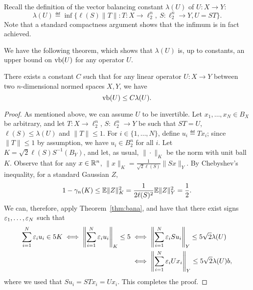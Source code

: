 Recall the definition of the vector balancing constant $\lambda(U)$ of
$U:X \to Y$: 
\[
\lambda(U) \eqdef \inf \{\ell(S)\|T\|: T: X \to \ell_2^n,\ S: \ell_2^n
\to Y, U = ST\}.
\]
Note that a standard compactness argument shows that the infimum is in fact achieved. 

We have the following theorem, which shows that $\lambda(U)$ is, up to
constants, an upper bound on $\operatorname{vb}(U)$ for any operator $U$. 

\begin{theorem}\label{thm:factorization}
  There exists a constant $C$ such that for any linear operator $U:X
  \to Y$ between two $n$-dimensional normed spaces $X, Y$, we have
  \[
  \operatorname{vb}(U) \le C\lambda(U).
  \]
\end{theorem}
\begin{proof}
  As mentioned above, we can assume $U$ to be invertible.  Let $x_1,
  \ldots, x_N \in B_X$ be arbitrary, and let $T:X \to \ell_2^n$,
  $S:\ell_2^n \to Y$ be such that $ST = U$, $\ell(S)\le \lambda(U)$
  and $\|T\| \le 1$. For $i \in \{1, \ldots, N\}$, define $u_i \eqdef
  Tx_i$; since $\|T\| \le 1$ by assumption, we have $u_i \in B_2^n$
  for all $i$. Let $K = \sqrt{2}\ell(S) S^{-1}(B_Y)$, and let, as
  usual, $\|\cdot\|_K$ be the norm with unit ball $K$. Observe that
  for any $x \in {\mathbb{R}}^n$, $\|x\|_K =
  \frac{1}{\sqrt{2}\ell(S)}\|Sx\|_Y$. By Chebyshev's inequality, for a
  standard Gaussian $Z$,
  \[
  1 - \gamma_n(K)  \le \mathbb{E}\|Z\|_K^2 
  =   \frac{1}{2\ell(S)^2} \mathbb{E}\|Z\|_Y^2 = \frac12.
  \]
  We can, therefore, apply Theorem~\ref{thm:bana}, and have that there
  exist signs $\varepsilon_1, \ldots, \varepsilon_N$ such that 
  \begin{align*}
  \sum_{i =1}^N{\varepsilon_i u_i} \in 5K
  \iff
  \left\|\sum_{i =1}^N{\varepsilon_i u_i}\right\|_K \le 5
  &\iff 
  \left\|\sum_{i = 1}^N{\varepsilon_i Su_i}\right\|_Y \le 5\sqrt{2}\lambda(U)\\
  &\iff   \left\|\sum_{i = 1}^N{\varepsilon_i Ux_i}\right\|_Y \le 5\sqrt{2}\lambda(U)b,
  \end{align*}
  where we used that $Su_i = STx_i = Ux_i$.
  This completes the proof.
\end{proof}

